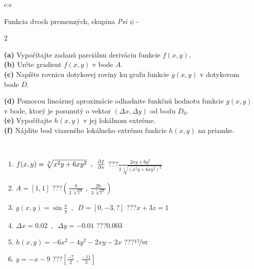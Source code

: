 \documentclass[10pt]{report}
\begin{document}
\begin{tabular}{c:c}
\begin{minipage}[c][104.5mm][t]{0.5\linewidth}
\begin{center}
\vspace{7mm}
{\huge \LARGE Funkcia dvoch premenných, skupina \textit{Psi $\psi$} -}\\[5mm]
\begin{minipage}{0.95\linewidth}
\begin{center}
{\small \begin{multicols}{2} \raggedright
\textbf{(a)} Vypočítajte zadanú parciálnu deriváciu funkcie \(f(x,y)\). \\[1mm]
\textbf{(b)} Určte gradient \(f(x,y)\) v bode \(A\). \\[1mm]
\textbf{(c)} Napíšte rovnicu dotykovej roviny ku grafu funkcie \(g(x,y)\) v dotykovom bode \(D\). \par \columnbreak
\textbf{(d)} Pomocou lineárnej aproximácie odhadnite funkčnú hodnotu funkcie \(g(x,y)\) v bode, ktorý je posunutý o vektor \((\Delta x, \Delta y)\) od bodu \(D_0\). \\[1mm]
\textbf{(e)} Vypočítajte \(h(x,y)\) v jej lokálnom extréme. \\[1mm]
\textbf{(f)} Nájdite bod viazeného lokálneho extrému funkcie \(h(x,y)\) na priamke. \\[1mm]
\end{multicols}
}
\end{center}
\end{minipage}
\\[4mm]
\begin{minipage}{0.79\linewidth}
\begin{center}
\begin{varwidth}{\linewidth}
\begin{enumerate}
\normalsizerr
\item $f(x,y) = \sqrt[3]{x^2y + 6xy^2}\enspace , \enspace \pdv{f}{x}$\quad \dotfill\; ???\;\dotfill \quad $\frac{2xy+6y^2}{3\,\sqrt[3]{(x^2y+6xy^2)^{2}}}$
\item $A = [1, 1]$\quad \dotfill\; ???\;\dotfill \quad $\left( \frac{8}{3\,\sqrt[3]{7^2}} \;,\; \frac{26}{3\,\sqrt[3]{7^2}} \right)$
\item $g(x,y) = \sin\frac{x}{y} \enspace , \enspace D = [0, -3, ?]$\quad \dotfill\; ???\;\dotfill \quad $x+3z=1$
\item $\Delta x = {0.02} \enspace,\enspace \Delta y = {-0.01}$\quad \dotfill\; ???\;\dotfill \quad $0.003$
\item $h(x,y) = -6x^2-4y^2-2xy-2x$\quad \dotfill\; ???\;\dotfill \quad $\nicefrac{17}{92}$
\item $y = -x-9$\quad \dotfill\; ???\;\dotfill \quad $\left[\frac{-7}{2}\;,\;\frac{-11}{3}\right]$

\end{enumerate}
\end{varwidth}
\end{center}
\end{minipage}
\end{center}
\end{minipage}
\end{tabular}
\end{document}
